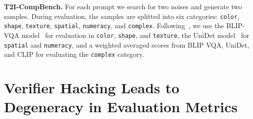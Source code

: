 \documentclass[11pt, letterpaper, logo]{googledeepmind}
\begin{document}
\textbf{T2I-CompBench.} For each prompt we search for two noises and generate two samples. During evaluation, the samples are splitted into six categories: \texttt{color},  \texttt{shape}, \texttt{texture}, \texttt{spatial}, \texttt{numeracy}, and \texttt{complex}. Following~\citet{huang2023t2i}, we use the BLIP-VQA model~\citep{li2022blip} for evaluation in \texttt{color},  \texttt{shape}, and \texttt{texture}, the UniDet model~\citep{zhou2022simple} for \texttt{spatial} and \texttt{numeracy}, and a weighted averaged scores from BLIP VQA, UniDet, and CLIP for evaluating the \texttt{complex} category.


\begin{table}[t!]
    \centering
    \caption{\footnotesize{\textbf{\emph{Break-down scores of LLM Grader for FLUX.1-dev and PixArt-$\Sigma$.}} The evaluation is done on DrawBench with random search and verifier ensemble.}}
    \label{tab:llm-break-down}
\end{table}

\vspace{-0.5cm}
\section{Verifier Hacking Leads to Degeneracy in Evaluation Metrics}
\label{app:sec:fid-loss-diversity}
\end{document}
